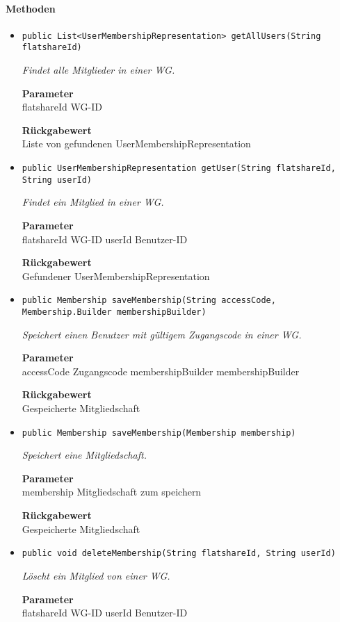     \paragraph*{Methoden}
    \begin{itemize}
    	\item{\texttt{public List<UserMembershipRepresentation> getAllUsers(String flatshareId)}}
    	
    	\textit{Findet alle Mitglieder in einer WG.}
    	
    	\textbf{Parameter} \\
    	flatshareId WG-ID
    	
    	\textbf{Rückgabewert} \\
    	Liste von gefundenen UserMembershipRepresentation        \item{\texttt{public UserMembershipRepresentation getUser(String flatshareId, String userId)}}
    	
    	\textit{Findet ein Mitglied in einer WG.}
    	
    	\textbf{Parameter} \\
    	flatshareId WG-ID
    	userId Benutzer-ID
    	
    	\textbf{Rückgabewert} \\
    	Gefundener UserMembershipRepresentation        \item{\texttt{public Membership saveMembership(String accessCode, Membership.Builder membershipBuilder)}}
    	
    	\textit{Speichert einen Benutzer mit gültigem Zugangscode in einer WG.}
    	
    	\textbf{Parameter} \\
    	accessCode Zugangscode
    	membershipBuilder membershipBuilder
    	
    	\textbf{Rückgabewert} \\
    	Gespeicherte Mitgliedschaft        \item{\texttt{public Membership saveMembership(Membership membership)}}
    	
    	\textit{Speichert eine Mitgliedschaft.}
    	
    	\textbf{Parameter} \\
    	membership Mitgliedschaft zum speichern
    	
    	\textbf{Rückgabewert} \\
    	Gespeicherte Mitgliedschaft        \item{\texttt{public void deleteMembership(String flatshareId, String userId)}}
    	
    	\textit{Löscht ein Mitglied von einer WG.}
    	
    	\textbf{Parameter} \\
    	flatshareId WG-ID
    	userId Benutzer-ID
    	
    	
    \end{itemize}
